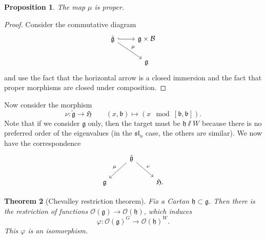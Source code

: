 \documentclass{amsart}
\newtheorem{thm}{Theorem}[section]
\newtheorem{prop}[thm]{Proposition}
\theoremstyle{definition}
\theoremstyle{remark}
\theoremstyle{plain}
\theoremstyle{definition}
\theoremstyle{remark}
\newcommand{\g}{\mathfrak{g}}
\newcommand{\h}{\mathfrak{h}}
\renewcommand{\b}{\mathfrak{b}}
\newcommand{\mc}[1]{\mathcal{#1}}
\newcommand{\mf}[1]{\mathfrak{#1}}
\newcommand{\1}{\mathbf{1}}
\newcommand{\2}{\mathbf{2}}
\newcommand{\3}{\mathbf{3}}
\renewcommand{\sl}{\mf{sl}}
\begin{document}
\begin{prop}
    The map \(\mu\) is proper.
\end{prop}

\begin{proof}
    Consider the commutative diagram
    \begin{equation*}
    \begin{tikzcd}
        \tilde{\g} \ar[hookrightarrow]{r} \ar{dr}{\mu} & \g \times \mc{B} \\
        & \g
    \end{tikzcd}
    \end{equation*}
    and use the fact that the horizontal arrow is a closed immersion and the fact that proper morphisms are closed under composition.
\end{proof}

Now consider the morphism
\[ \nu \colon \tilde{\g} \to \mf{H} \qquad (x, \b) \mapsto (x \mod{[\b, \b]}). \]
Note that if we consider \(\g\) only, then the target must be \(\h \sslash W\) because there is no preferred order of the eigenvalues (in the \(\sl_n\) case, the others are similar). We now have the correspondence
\begin{equation}\label{eqn:springer-correspondence}
\begin{tikzcd}
    & \tilde{\g} \ar{dl}[swap]{\mu} \ar{dr}{\nu} \\
    \g & & \mf{H}.
\end{tikzcd}
\end{equation}

\begin{thm}[Chevalley restriction theorem]
    Fix a Cartan \(\h \subset \g\). Then there is the restriction of functions \(\mc{O}(\g) \to \mc{O}(\h)\), which induces
    \[ \varphi \colon \mc{O}(\g)^G \to \mc{O}(\h)^W. \]
    This \(\varphi\) is an isomorphism.
\end{thm}
\end{document}
